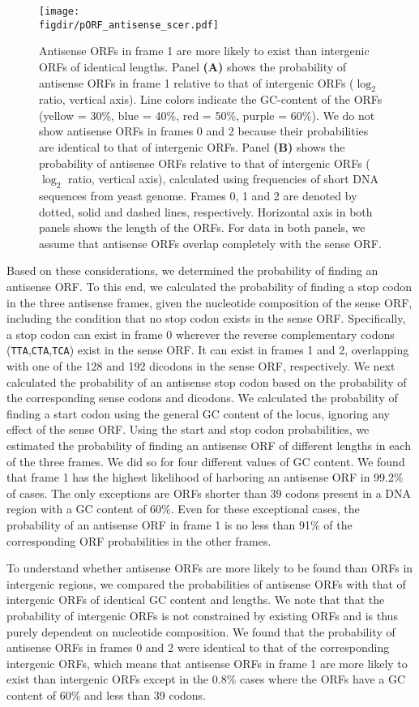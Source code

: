 \documentclass[12pt,a4paper]{article}
\begin{document}
\begin{figure}[!t]
\centering
\texttt{[image: \\figdir/pORF\_antisense\_scer.pdf]}
\caption{Antisense ORFs in frame 1 are more likely to exist than intergenic ORFs of identical lengths. Panel \textbf{(A)} shows the probability of antisense ORFs in frame 1 relative to that of intergenic ORFs ($\log_2$ ratio, vertical axis). Line colors indicate the GC-content of the ORFs (yellow = 30\%, blue = 40\%, red = 50\%, purple = 60\%). We do not show antisense ORFs in frames 0 and 2 because their probabilities are identical to that of intergenic ORFs. Panel \textbf{(B)} shows the probability of antisense ORFs relative to that of intergenic ORFs ($\log_2$ ratio, vertical axis), calculated using frequencies of short DNA sequences from yeast genome. Frames 0, 1 and 2 are denoted by dotted, solid and dashed lines, respectively. Horizontal axis in both panels shows the length of the ORFs. For data in both panels, we assume that antisense ORFs overlap completely with the sense ORF.}
\label{pORF}
\end{figure}

Based on these considerations, we determined the probability of finding an antisense ORF. To this end, we calculated the probability of finding a stop codon in the three antisense frames, given the nucleotide composition of the sense ORF, including the condition that no stop codon exists in the sense ORF. Specifically, a stop codon can exist in frame 0 wherever the reverse complementary codons (\texttt{TTA},\texttt{CTA},\texttt{TCA}) exist in the sense ORF. It can exist in frames 1 and 2, overlapping with one of the 128 and 192 dicodons in the sense ORF, respectively. We next calculated the probability of an antisense stop codon based on the probability of the corresponding sense codons and dicodons. We calculated the probability of finding a start codon using the general GC content of the locus, ignoring any effect of the sense ORF. Using the start and stop codon probabilities, we estimated the probability of finding an antisense ORF of different lengths in each of the three frames. We did so for four different values of GC content. We found that frame 1 has the highest likelihood of harboring an antisense ORF in 99.2\% of cases. The only exceptions are ORFs shorter than 39 codons present in a DNA region with a GC content of 60\%. Even for these exceptional cases, the probability of an antisense ORF in frame 1 is no less than 91\% of the corresponding ORF probabilities in the other frames. 

To understand whether antisense ORFs are more likely to be found than ORFs in intergenic regions, we compared the probabilities of antisense ORFs with that of intergenic ORFs of identical GC content and lengths. We note that that the probability of intergenic ORFs is not constrained by existing ORFs and is thus purely dependent on nucleotide composition. We found that the probability of antisense ORFs in frames 0 and 2 were identical to that of the corresponding intergenic ORFs, which means that antisense ORFs in frame 1 are more likely to exist than intergenic ORFs except in the 0.8\% cases where the ORFs have a GC content of 60\% and less than 39 codons. 
\end{document}

